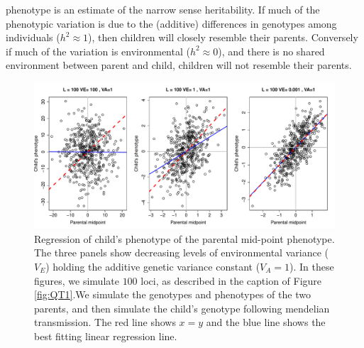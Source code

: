phenotype is an estimate of the narrow sense
heritability. If much
of the phenotypic variation is due to the (additive) differences in
genotypes among individuals ($h^2 \approx 1$), then children will closely resemble their
parents. Conversely if much of the variation is environmental  ($h^2 \approx 0$), and
there is no shared environment between parent and child, children will
not resemble their parents.

\begin{figure}
\begin{center}
\includegraphics[width=\textwidth]{figures/QT2.pdf}
\end{center}
\caption{Regression of child's phenotype of the parental mid-point phenotype. The three panels show decreasing levels of environmental
  variance ($V_E$) holding the additive genetic variance constant ($V_A=1$). 
 In these figures, we simulate $100$ loci, as described in
 the caption of Figure \ref{fig:QT1}.We simulate the genotypes and
 phenotypes of the two parents, and then simulate the child's genotype
following mendelian transmission. The red line shows $x=y$ and the blue
line shows the best fitting linear regression
line. 
} \label{fig:midpar}
\end{figure}


